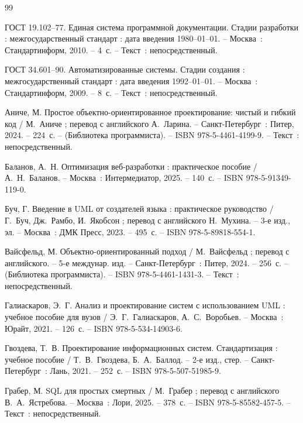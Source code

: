 
\begin{thebibliography}{99}

     ГОСТ 19.102--77. Единая система программной документации. Стадии разработки : межгосударственный стандарт : дата введения 1980--01--01. -- Москва~: Стандартинформ, 2010. -- 4~с. -- Текст~: непосредственный.

     ГОСТ 34.601--90. Автоматизированные системы. Стадии создания : межгосударственный стандарт : дата введения 1992--01--01. -- Москва~: Стандартинформ, 2009. -- 8~с. -- Текст~: непосредственный.

     Аниче, М. Простое объектно-ориентированное проектирование: чистый и гибкий код / М.~Аниче ; перевод с английского А.~Ларина. -- Санкт-Петербург~: Питер, 2024. -- 224~с. -- (Библиотека программиста). -- ISBN 978-5-4461-4199-9. -- Текст~: непосредственный.

     Баланов, А.~Н. Оптимизация веб-разработки : практическое пособие / А.~Н.~Баланов. -- Москва~: Интермедиатор, 2025. -- 140~с. -- ISBN 978-5-91349-119-0.

     Буч, Г. Введение в UML от создателей языка : практическое руководство / Г.~Буч, Дж.~Рамбо, И.~Якобсон ; перевод с английского Н.~Мухина. -- 3-е изд., эл. -- Москва~: ДМК Пресс, 2023. -- 495~с. -- ISBN 978-5-89818-554-1.

     Вайсфельд, М. Объектно-ориентированный подход / М.~Вайсфельд ; перевод с английского. -- 5-е междунар. изд. -- Санкт-Петербург~: Питер, 2024. -- 256~с. -- (Библиотека программиста). -- ISBN 978-5-4461-1431-3. -- Текст~: непосредственный.

     Галиаскаров, Э.~Г. Анализ и проектирование систем с использованием UML : учебное пособие для вузов / Э.~Г.~Галиаскаров, А.~С.~Воробьев. -- Москва~: Юрайт, 2021. -- 126~с. -- ISBN 978-5-534-14903-6. 

     Гвоздева, Т.~В. Проектирование информационных систем. Стандартизация : учебное пособие / Т.~В.~Гвоздева, Б.~А.~Баллод. -- 2-е изд., стер. -- Санкт-Петербург~: Лань, 2021. -- 252~с. -- ISBN 978-5-507-51985-9. 

     Грабер, М. SQL для простых смертных / М.~Грабер ; перевод с английского В.~А.~Ястребова. -- Москва~: Лори, 2025. -- 378~с. -- ISBN 978-5-85582-457-5. -- Текст~: непосредственный.


\end{thebibliography}
